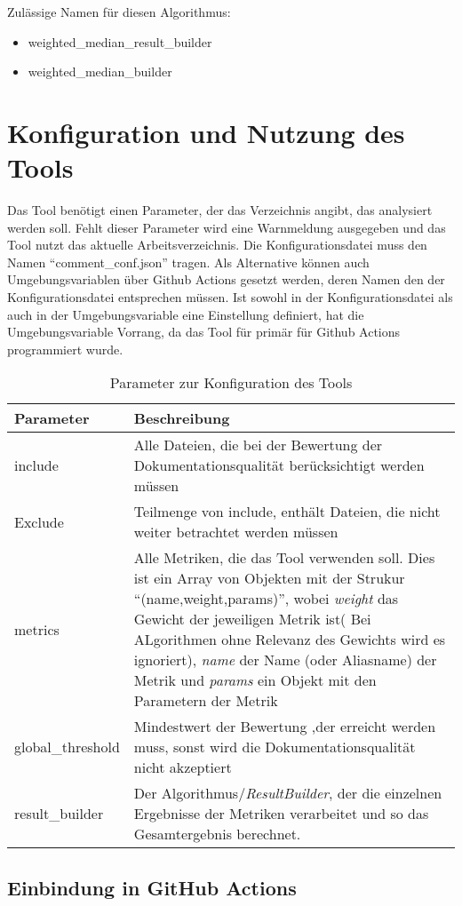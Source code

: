 Zulässige Namen für diesen Algorithmus:
\begin{itemize}
\item weighted\_median\_result\_builder
\item weighted\_median\_builder
\end{itemize}
\section{Konfiguration und Nutzung des Tools}
Das Tool benötigt einen Parameter, der das Verzeichnis angibt, das analysiert werden soll. Fehlt dieser Parameter wird eine Warnmeldung ausgegeben und das Tool nutzt das aktuelle Arbeitsverzeichnis. Die Konfigurationsdatei muss den Namen \enquote{comment\_conf.json} tragen. Als Alternative können auch Umgebungsvariablen über Github Actions gesetzt werden, deren Namen den der Konfigurationsdatei entsprechen müssen. Ist sowohl in der Konfigurationsdatei als auch in der Umgebungsvariable eine Einstellung definiert, hat die Umgebungsvariable Vorrang, da das Tool für primär für Github Actions programmiert wurde.
\begin{table}[h]
    \centering
    \begin{tabular}{m{4cm}|m{11cm}}
    \hline
        Parameter & Beschreibung  \\
        \hline
        include & Alle Dateien, die bei der Bewertung der Dokumentationsqualität berücksichtigt werden müssen\\
        \hline
        Exclude & Teilmenge von include, enthält Dateien, die nicht weiter betrachtet werden müssen\\
        \hline
        metrics & Alle Metriken, die das Tool verwenden soll. Dies ist ein Array von Objekten mit der Strukur \enquote{(name,weight,params)}, wobei \textit{weight} das Gewicht der jeweiligen Metrik ist( Bei ALgorithmen ohne Relevanz des Gewichts wird es ignoriert), \textit{name} der Name (oder Aliasname) der Metrik und \textit{params} ein Objekt mit den Parametern der Metrik\\\hline
        global\_threshold & Mindestwert der Bewertung ,der erreicht werden muss, sonst wird die Dokumentationsqualität nicht akzeptiert\\\hline
        result\_builder & Der Algorithmus/\textit{ResultBuilder}, der die einzelnen Ergebnisse der Metriken verarbeitet und so das Gesamtergebnis berechnet.
        
    \end{tabular}
    \caption{Parameter zur Konfiguration des Tools}
    \label{tab:tool_javadoc_conf}
\end{table}
\subsection{Einbindung in GitHub Actions}
